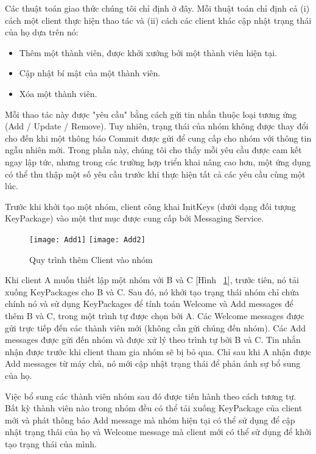 \documentclass[../main-report.tex]{subfiles}
\begin{document}
Các thuật toán giao thức chúng tôi chỉ định ở đây. Mỗi thuật toán chỉ định cả (i) cách một client thực hiện thao tác và (ii) cách các client khác cập nhật trạng thái của họ dựa trên nó:

\begin{itemize}
\item{Thêm một thành viên, được khởi xướng bởi một thành viên hiện tại.}
\item{Cập nhật bí mật của một thành viên.}
\item{Xóa một thành viên.}
\end{itemize}

Mỗi thao tác này được "yêu cầu" bằng cách gửi tin nhắn thuộc loại tương ứng (\glsdesc{Add} / \glsdesc{Update} / \glsdesc{Remove}). Tuy nhiên, trạng thái của nhóm không được thay đổi cho đến khi một thông báo \glsdesc{Commit} được gửi để cung cấp cho nhóm với thông tin ngẫu nhiên mới. Trong phần này, chúng tôi cho thấy mỗi yêu cầu được cam kết ngay lập tức, nhưng trong các trường hợp triển khai nâng cao hơn, một ứng dụng có thể thu thập một số yêu cầu trước khi thực hiện tất cả các yêu cầu cùng một lúc.

Trước khi khởi tạo một nhóm, client công khai InitKeys (dưới dạng đối tượng KeyPackage) vào một thư mục được cung cấp bởi \glsdesc{Messaging Service}.

\begin{figure}[!h]
\begin{center}
\label{fig:Add}
\texttt{[image: Add1]}
\texttt{[image: Add2]}
\caption{Quy trình thêm Client vào nhóm}
\end{center}
\end{figure}

Khi client A muốn thiết lập một nhóm với B và C [Hình ~\ref{fig:Add}], trước tiên, nó tải xuống KeyPackages cho B và C. Sau đó, nó khởi tạo trạng thái nhóm chỉ chứa chính nó và sử dụng KeyPackages để tính toán Welcome và Add messages để thêm B và C, trong một trình tự được chọn bởi A. Các Welcome messages được gửi trực tiếp đến các thành viên mới (không cần gửi chúng đến nhóm). Các Add messages được gửi đến nhóm và được xử lý theo trình tự bởi B và C. Tin nhắn nhận được trước khi client tham gia nhóm sẽ bị bỏ qua. Chỉ sau khi A nhận được Add messages từ máy chủ, nó mới cập nhật trạng thái để phản ánh sự bổ sung của họ.

Việc bổ sung các thành viên nhóm sau đó được tiến hành theo cách tương tự. Bất kỳ thành viên nào trong nhóm đều có thể tải xuống KeyPackage của client mới và phát thông báo Add message mà nhóm hiện tại có thể sử dụng để cập nhật trạng thái của họ và Welcome message mà client mới có thể sử dụng để khởi tạo trạng thái của mình.
\end{document}
